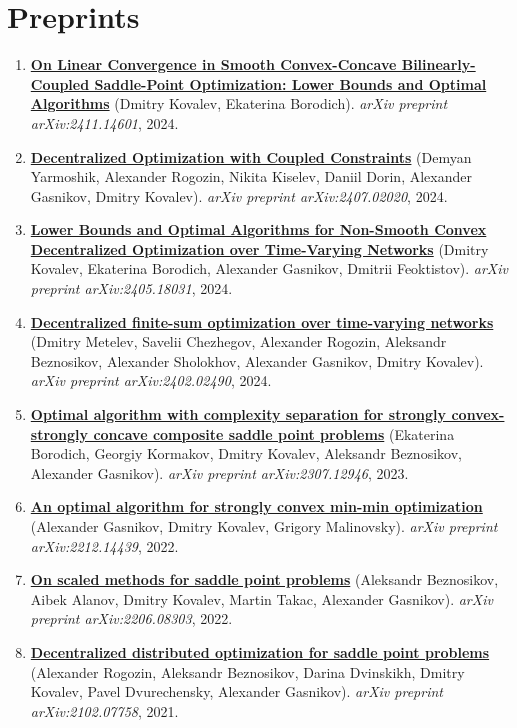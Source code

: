 \section{Preprints}
\begin{enumerate}
\item
\textbf{\href{https://arxiv.org/abs/2411.14601}{On Linear Convergence in Smooth Convex-Concave Bilinearly-Coupled Saddle-Point Optimization: Lower Bounds and Optimal Algorithms}} (Dmitry Kovalev, Ekaterina Borodich). \textit{arXiv preprint arXiv:2411.14601}, 2024.
\item
\textbf{\href{https://arxiv.org/abs/2407.02020}{Decentralized Optimization with Coupled Constraints}} (Demyan Yarmoshik, Alexander Rogozin, Nikita Kiselev, Daniil Dorin, Alexander Gasnikov, Dmitry Kovalev). \textit{arXiv preprint arXiv:2407.02020}, 2024.
\item
\textbf{\href{https://arxiv.org/abs/2405.18031}{Lower Bounds and Optimal Algorithms for Non-Smooth Convex Decentralized Optimization over Time-Varying Networks}} (Dmitry Kovalev, Ekaterina Borodich, Alexander Gasnikov, Dmitrii Feoktistov). \textit{arXiv preprint arXiv:2405.18031}, 2024.
\item
\textbf{\href{https://arxiv.org/abs/2402.02490}{Decentralized finite-sum optimization over time-varying networks}} (Dmitry Metelev, Savelii Chezhegov, Alexander Rogozin, Aleksandr Beznosikov, Alexander Sholokhov, Alexander Gasnikov, Dmitry Kovalev). \textit{arXiv preprint arXiv:2402.02490}, 2024.
\item
\textbf{\href{https://arxiv.org/abs/2307.12946}{Optimal algorithm with complexity separation for strongly convex-strongly concave composite saddle point problems}} (Ekaterina Borodich, Georgiy Kormakov, Dmitry Kovalev, Aleksandr Beznosikov, Alexander Gasnikov). \textit{arXiv preprint arXiv:2307.12946}, 2023.
\item
\textbf{\href{https://arxiv.org/abs/2212.14439}{An optimal algorithm for strongly convex min-min optimization}} (Alexander Gasnikov, Dmitry Kovalev, Grigory Malinovsky). \textit{arXiv preprint arXiv:2212.14439}, 2022.
\item
\textbf{\href{https://arxiv.org/abs/2206.08303}{On scaled methods for saddle point problems}} (Aleksandr Beznosikov, Aibek Alanov, Dmitry Kovalev, Martin Takac, Alexander Gasnikov). \textit{arXiv preprint arXiv:2206.08303}, 2022.
\item
\textbf{\href{https://arxiv.org/abs/2102.07758}{Decentralized distributed optimization for saddle point problems}} (Alexander Rogozin, Aleksandr Beznosikov, Darina Dvinskikh, Dmitry Kovalev, Pavel Dvurechensky, Alexander Gasnikov). \textit{arXiv preprint arXiv:2102.07758}, 2021.

\end{enumerate}
